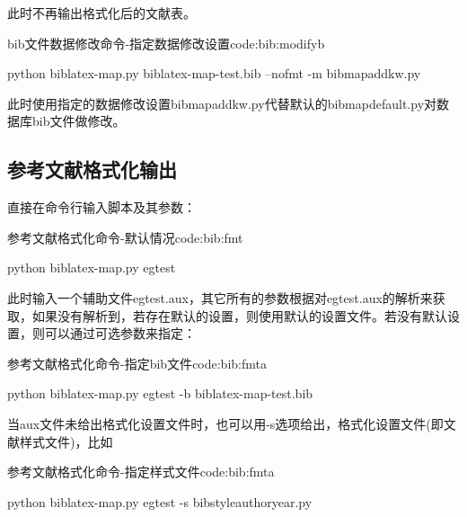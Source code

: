 \documentclass{article}
\begin{document}
此时不再输出格式化后的文献表。

\begin{example}{bib文件数据修改命令-指定数据修改设置}{code:bib:modifyb}
\begin{pycode}
python biblatex-map.py biblatex-map-test.bib --nofmt -m bibmapaddkw.py
\end{pycode}
\end{example}

此时使用指定的数据修改设置bibmapaddkw.py代替默认的bibmapdefault.py对数据库bib文件做修改。



\subsection{参考文献格式化输出}

直接在命令行输入脚本及其参数：

\begin{example}{参考文献格式化命令-默认情况}{code:bib:fmt}
\begin{pycode}
python biblatex-map.py egtest
\end{pycode}
\end{example}

此时输入一个辅助文件egtest.aux，其它所有的参数根据对egtest.aux的解析来获取，如果没有解析到，若存在默认的设置，则使用默认的设置文件。若没有默认设置，则可以通过可选参数来指定：

\begin{example}{参考文献格式化命令-指定bib文件}{code:bib:fmta}
\begin{pycode}
python biblatex-map.py egtest -b biblatex-map-test.bib
\end{pycode}
\end{example}

当aux文件未给出格式化设置文件时，也可以用-s选项给出，格式化设置文件(即文献样式文件)，比如
\begin{example}{参考文献格式化命令-指定样式文件}{code:bib:fmta}
\begin{pycode}
python biblatex-map.py egtest -s bibstyleauthoryear.py
\end{pycode}
\end{example}
\end{document}
